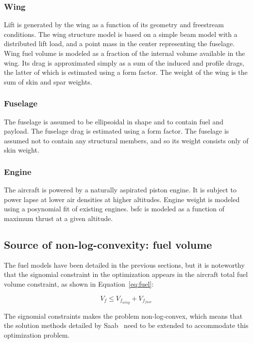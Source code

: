 \subsubsection{Wing}

Lift is generated by the wing as a function of its geometry and freestream conditions.
The wing structure model is based on a simple beam model with a distributed lift load,
and a point mass in the center representing the fuselage.
Wing fuel volume is modeled as a fraction of the internal volume available in the wing.
Its drag is
approximated simply as a sum of the induced and profile drags, the latter of which is estimated using a
form factor. The weight of the wing is the sum of skin and spar weights.

\subsubsection{Fuselage}

The fuselage is assumed to be ellipsoidal in shape and to contain fuel and payload.
The fuselage drag is estimated using a form factor.
The fuselage is assumed not to contain any structural members, and so its weight consists only of skin weight.

\subsubsection{Engine}

The aircraft is powered by a naturally aspirated piston engine. It is subject to
power lapse at lower air densities at higher altitudes. Engine weight is modeled using a posynomial fit of existing
engines. \gls{bsfc} is modeled as a function of maximum thrust at a given altitude.

\subsection{Source of non-log-convexity: fuel volume}
The fuel models have been detailed in the previous sections, but it is noteworthy that
the signomial constraint in the optimization appears in the aircraft total fuel volume constraint,
as shown in Equation~\ref{eq:fuel}:

\begin{equation}
\label{eq:fuel}
V_f \leq V_{f_{wing}} + V_{f_{fuse}} 
\end{equation}

The signomial constraints makes the problem non-log-convex, which means that the solution methods
detailed by Saab~\cite{Saab2018} need to be extended to accommodate this optimization problem.

